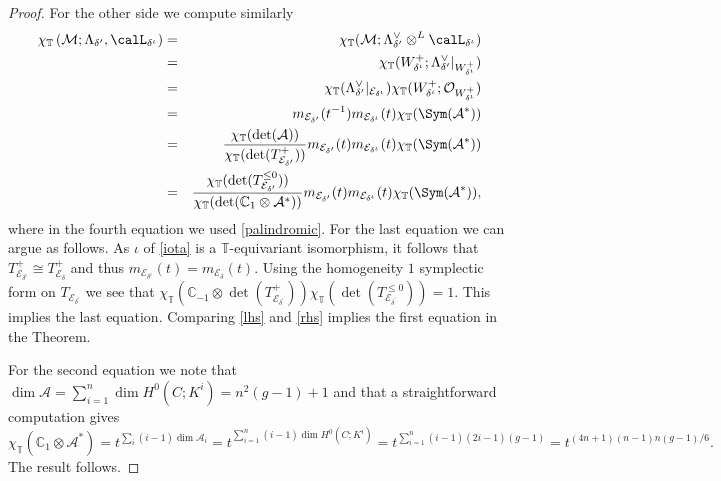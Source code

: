 \documentclass[12pt]{article}
\numberwithin{equation}{section}
\theoremstyle{remark}
\theoremstyle{definition}
\numberwithin{theorem}{section}
\def\beq{\begin{eqnarray}}
\def\eeq{\end{eqnarray}}
\def\ddelta{{{\delta}}}
\def\calE{{\mathcal E}}
\def\C{\mathbb{C}}
\def\M{{\mathcal{M}}}
\def\calA{{\mathcal{A}}}
\newcommand{\T}{{\mathbb{T}}}
\def\calO{{\mathcal O}}
\def\d{{{\delta}}}
\renewcommand{\1}{\mathbbm{1}}
\begin{document}
\begin{proof}
	For the other side we compute similarly \beq \chi_\T\left(\M;\Lambda_{\ddelta^\prime},\calL_{\ddelta^\iota}\right)\nonumber&=&\chi_\T(\M;\Lambda^\vee_{\ddelta^\prime}\otimes^L\calL_{\ddelta^\iota})\\ \nonumber&=&\chi_\T(W^+_{\d^\iota};\Lambda^\vee_{\ddelta^\prime}|_{W^+_{\d^\iota}} )\\ \nonumber&=&\chi_\T(\Lambda^\vee_{\ddelta^\prime}|_{{\calE_{\ddelta^\iota}}} )\chi_\T(W^+_{\d^\iota};\calO_{W^+_{\d^\iota}} )\\ \nonumber&=& m_{\calE_{\d^\prime}}(t^{-1}) m_{\calE_{\d^\iota}}(t)\chi_\T(\Sym(\calA^*))\\ \nonumber&=& \frac{\chi_\T(\det(\calA))}{\chi_\T(\det(T^+_{\calE_{\d^\prime}}))}m_{\calE_{\d^\prime}}(t) m_{\calE_{\d^\iota}}(t)\chi_\T(\Sym(\calA^*)) \\ &=& \frac{\chi_\T(\det(T^{\leq 0}_{\calE_{\d^\prime}}))}{\chi_\T(\det(\C_{1}\otimes\calA^*))}m_{\calE_{\d^\prime}}(t) m_{\calE_{\d^\iota}}(t)\chi_\T(\Sym(\calA^*)), \label{rhs}
	\eeq
	where in the fourth equation we used \eqref{palindromic}. For the last equation we can argue as follows. As $\iota$ of \eqref{iota} is a $\T$-equivariant isomorphism, it follows that $T^+_{\calE_{\d^\iota}}\cong T^+_{\calE_{\d}}$ and thus $m_{\calE_{\d^\iota}}(t)=m_{\calE_{\d}}(t)$. Using the homogeneity $1$ symplectic form on $T_{\calE_{\d^\prime}} $ we see that $\chi_\T(\C_{-1}\otimes\det(T^+_{\calE_{\d^\prime}}))\chi_\T(\det(T^{\leq  0}_{\calE_{\d^\prime}}))=1$. This implies the last equation. Comparing \eqref{lhs} and \eqref{rhs} implies the first equation in the Theorem.
	
	For the second equation we note that $\dim \calA=\sum_{i=1}^n\dim H^0(C;K^i)= n^2(g-1)+1$ and that a straightforward computation  gives $$\chi_\T(\C_1\otimes \calA^*)=t^{\sum_i (i-1)\dim \calA_i}=t^{\sum_{i=1}^n (i-1)\dim H^0(C;K^i)}=t^{\sum_{i=1}^n (i-1)(2i-1)(g-1)}=t^{(4n+1)(n-1)n(g-1)/6} .$$ The result follows. 
	
	
	

\end{proof}
\end{document}
